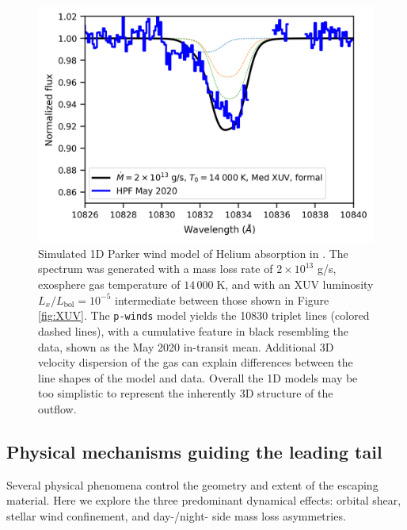 \documentclass[twocolumn]{aastex631}
\newcommand{\hatpb}{\object{HAT-P-67 b}}
\begin{document}
\begin{figure}
    \includegraphics[width=\linewidth]{figures/pwinds_May2020_14000_2e13Mdot_medXUV_formal_rv.png}
    \caption{Simulated 1D Parker wind model of Helium absorption in \hatpb.  The spectrum was generated with a mass loss rate of $2\times10^{13}$ g/s, exosphere gas temperature of $14\,000\;$K, and with an XUV luminosity $L_x/L_\mathrm{bol}=10^{-5}$ intermediate between those shown in Figure \ref{fig:XUV}.  The \texttt{p-winds} model yields the  10830 triplet lines (colored dashed lines), with a cumulative feature in black resembling the data, shown as the May 2020 in-transit mean.  Additional 3D velocity dispersion of the gas can explain differences between the line shapes of the model and data.  Overall the 1D models may be too simplistic to represent the inherently 3D structure of the outflow.}
    \label{fig:pwinds}
\end{figure}

\subsection{Physical mechanisms guiding the leading tail} \label{secLeading}
Several physical phenomena control the geometry and extent of the escaping material.  Here we explore the three predominant dynamical effects: orbital shear, stellar wind confinement, and day-/night- side mass loss asymmetries.
\end{document}
